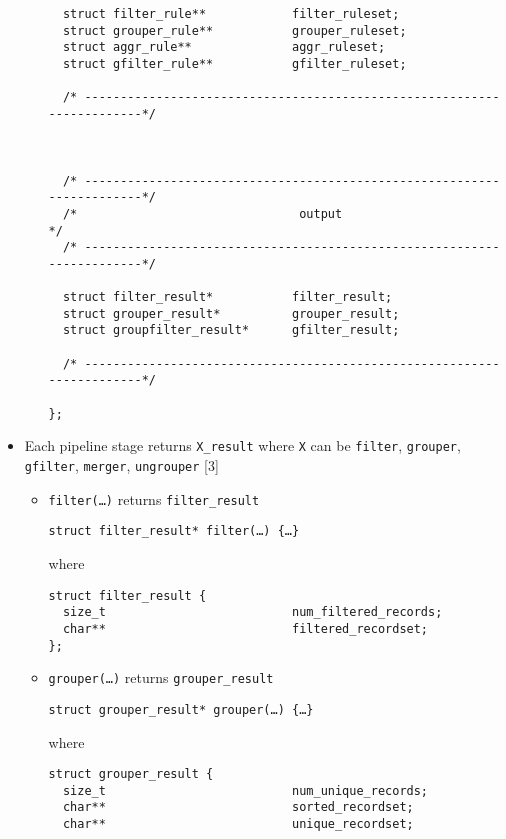 \begin{itemize}
\begin{itemize}
\begin{lstlisting}
  struct filter_rule**            filter_ruleset;  
  struct grouper_rule**           grouper_ruleset;
  struct aggr_rule**              aggr_ruleset;  
  struct gfilter_rule**           gfilter_ruleset;  

  /* -----------------------------------------------------------------------*/  



  /* -----------------------------------------------------------------------*/  
  /*                               output                                   */
  /* -----------------------------------------------------------------------*/  

  struct filter_result*           filter_result;
  struct grouper_result*          grouper_result;
  struct groupfilter_result*      gfilter_result;

  /* -----------------------------------------------------------------------*/  

};
\end{lstlisting}
  \end{itemize}
\item
  Each pipeline stage returns \lstinline!X_result! where \lstinline!X!
  can be \lstinline!filter!, \lstinline!grouper!, \lstinline!gfilter!,
  \lstinline!merger!, \lstinline!ungrouper! {[}3{]}

  \begin{itemize}
  \item
    \lstinline!filter(…)! returns \lstinline!filter_result!

\begin{lstlisting}
struct filter_result* filter(…) {…}
\end{lstlisting}

    where

\begin{lstlisting}
struct filter_result {          
  size_t                          num_filtered_records;
  char**                          filtered_recordset;  
};
\end{lstlisting}
  \item
    \lstinline!grouper(…)! returns \lstinline!grouper_result!

\begin{lstlisting}
struct grouper_result* grouper(…) {…}
\end{lstlisting}

    where

\begin{lstlisting}
struct grouper_result {
  size_t                          num_unique_records;  
  char**                          sorted_recordset;
  char**                          unique_recordset;


\end{lstlisting}
\end{itemize}
\end{itemize}

